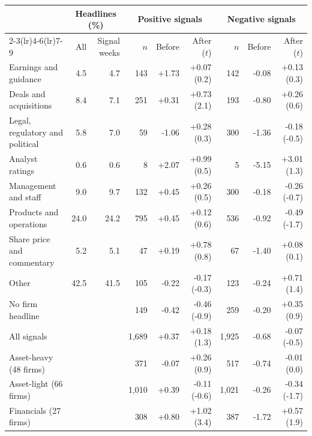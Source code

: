 \begin{tabular}{lrrrrrrrr}
\toprule
 & \multicolumn{2}{c}{Headlines (\%)} & \multicolumn{3}{c}{Positive signals} & \multicolumn{3}{c}{Negative signals}\\
\cmidrule(lr){2-3}\cmidrule(lr){4-6}\cmidrule(lr){7-9}
 & All & Signal weeks & $n$ & Before & After ($t$) & $n$ & Before & After ($t$)\\
\midrule
Earnings and guidance & 4.5 & 4.7 & 143 & +1.73 & +0.07 (0.2) & 142 & -0.08 & +0.13 (0.3)\\
Deals and acquisitions & 8.4 & 7.1 & 251 & +0.31 & +0.73 (2.1) & 193 & -0.80 & +0.26 (0.6)\\
Legal, regulatory and political & 5.8 & 7.0 & 59 & -1.06 & +0.28 (0.3) & 300 & -1.36 & -0.18 (-0.5)\\
Analyst ratings & 0.6 & 0.6 & 8 & +2.07 & +0.99 (0.5) & 5 & -5.15 & +3.01 (1.3)\\
Management and staff & 9.0 & 9.7 & 132 & +0.45 & +0.26 (0.5) & 300 & -0.18 & -0.26 (-0.7)\\
Products and operations & 24.0 & 24.2 & 795 & +0.45 & +0.12 (0.6) & 536 & -0.92 & -0.49 (-1.7)\\
Share price and commentary & 5.2 & 5.1 & 47 & +0.19 & +0.78 (0.8) & 67 & -1.40 & +0.08 (0.1)\\
Other & 42.5 & 41.5 & 105 & -0.22 & -0.17 (-0.3) & 123 & -0.24 & +0.71 (1.4)\\
No firm headline &  &  & 149 & -0.42 & -0.46 (-0.9) & 259 & -0.20 & +0.35 (0.9)\\
\midrule
All signals &  &  & 1,689 & +0.37 & +0.18 (1.3) & 1,925 & -0.68 & -0.07 (-0.5)\\
\midrule
Asset-heavy (48 firms) &  &  & 371 & -0.07 & +0.26 (0.9) & 517 & -0.74 & -0.01 (0.0)\\
Asset-light (66 firms) &  &  & 1,010 & +0.39 & -0.11 (-0.6) & 1,021 & -0.26 & -0.34 (-1.7)\\
Financials (27 firms) &  &  & 308 & +0.80 & +1.02 (3.4) & 387 & -1.72 & +0.57 (1.9)\\
\bottomrule
\end{tabular}
